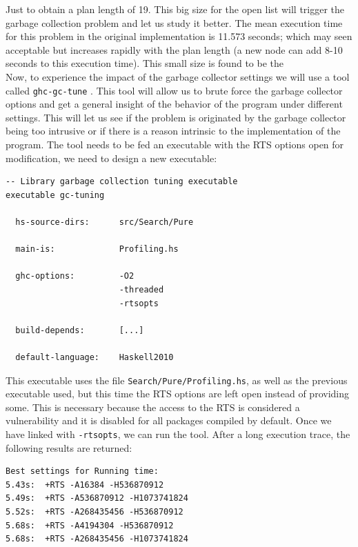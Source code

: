 Just to obtain a plan length of 19. This big size for the open list will
trigger the garbage collection problem and let us study it better. The mean
execution time for this problem in the original implementation is 11.573
seconds; which may seen acceptable but increases rapidly with the plan length
(a new node can add 8-10 seconds to this execution time). This small size is
found to be the \\

Now, to experience the impact of the garbage collector settings we will use a
tool called \texttt{ghc-gc-tune} \cite{ghc-gc-tune}. This tool will allow us to
brute force the garbage collector options and get a general insight of the
behavior of the program under different settings. This will let us see if the
problem is originated by the garbage collector being too intrusive or if there
is a reason intrinsic to the implementation of the program. The tool needs to
be fed an executable with the RTS options open for modification, we need to
design a new executable:\\

\begin{lstlisting}[style=haskell, label=gc-cabal, caption=
Setup for the \texttt{gc-tuning} executable in the Cabal file]
-- Library garbage collection tuning executable
executable gc-tuning

  hs-source-dirs:      src/Search/Pure
           
  main-is:             Profiling.hs
  
  ghc-options:         -O2
                       -threaded
                       -rtsopts

  build-depends:       [...]

  default-language:    Haskell2010
\end{lstlisting}

This executable uses the file \texttt{Search/Pure/Profiling.hs}, as well as the
previous executable used, but this time the RTS options are left open instead
of providing some. This is necessary because the access to the RTS is
considered a vulnerability and it is disabled for all packages compiled by
default. Once we have linked with \texttt{-rtsopts}, we can run the tool. After
a long execution trace, the following results are returned:\\

\begin{lstlisting}
Best settings for Running time:
5.43s:  +RTS -A16384 -H536870912
5.49s:  +RTS -A536870912 -H1073741824
5.52s:  +RTS -A268435456 -H536870912
5.68s:  +RTS -A4194304 -H536870912
5.68s:  +RTS -A268435456 -H1073741824
\end{lstlisting}

